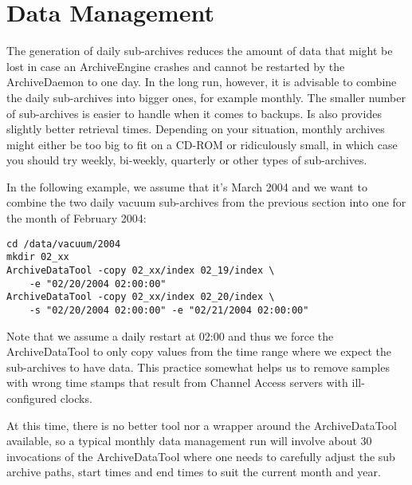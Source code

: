 \section{Data Management}
The generation of daily sub-archives reduces the amount of data that
might be lost in case an ArchiveEngine crashes and cannot be restarted
by the ArchiveDaemon to one day. In the long run, however, it is
advisable to combine the daily sub-archives into bigger ones, for
example monthly. The smaller number of sub-archives is easier to
handle when it comes to backups. Is also provides slightly better
retrieval times. Depending on your situation, monthly archives might either
be too big to fit on a CD-ROM or ridiculously small, in which case you
should try weekly, bi-weekly, quarterly or other types of sub-archives.

In the following example, we assume that it's March 2004 and we want
to combine the two daily vacuum sub-archives from the previous section
into one for the month of February 2004:
\begin{lstlisting}[frame=none,keywordstyle=\sffamily]
cd /data/vacuum/2004
mkdir 02_xx
ArchiveDataTool -copy 02_xx/index 02_19/index \
    -e "02/20/2004 02:00:00"
ArchiveDataTool -copy 02_xx/index 02_20/index \
    -s "02/20/2004 02:00:00" -e "02/21/2004 02:00:00"
\end{lstlisting}
\noindent Note that we assume a daily restart at 02:00 and thus we
force the ArchiveDataTool to only copy values from the time range
where we expect the sub-archives to have data. This practice somewhat
helps us to remove samples with wrong time stamps that result from
Channel Access servers with ill-configured clocks.

At this time, there is no better tool nor a wrapper around the
ArchiveDataTool available, so a typical monthly data management run
will involve about 30 invocations of the ArchiveDataTool where one
needs to carefully adjust the sub archive paths, start times and end
times to suit the current month and year.

